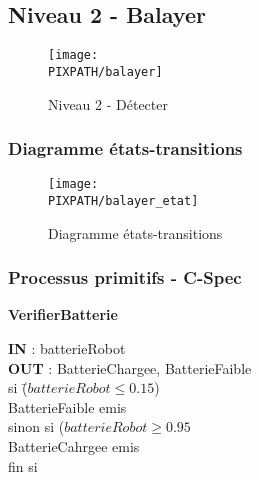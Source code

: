 \subsection{Niveau 2 - Balayer}

\begin{center}
\begin{figure}[!h]
\texttt{[image: \\PIXPATH/balayer]}
\caption{Niveau 2 - Détecter}
\end{figure}
\end{center}


\subsubsection{Diagramme états-transitions}

\begin{center}
\begin{figure}[!h]
\texttt{[image: \\PIXPATH/balayer\_etat]}
\caption{Diagramme états-transitions}
\end{figure}
\end{center}

\subsubsection{Processus primitifs - C-Spec}

\begin{description}
	
	\item \textbf{VerifierBatterie}
		\begin{tabbing} 
		\textbf{IN} : batterieRobot \\
		\textbf{OUT} : BatterieChargee, BatterieFaible \\
		si \=($batterieRobot \leq 0.15$) \\
			\>BatterieFaible emis \\
		sinon si ($batterieRobot \geq 0.95$ \\
			\>BatterieCahrgee emis \\
		fin si 
		\end{tabbing}


\end{description}

\vfill
\pagebreak

